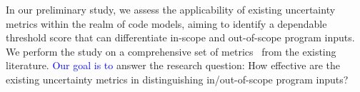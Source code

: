 In our preliminary study,  we assess the applicability of existing uncertainty metrics within the realm of code models, aiming to identify a dependable threshold score that can differentiate in-scope and out-of-scope program inputs. We perform the study on a comprehensive set of metrics~\cite{guo2017calibration,wang2020dissector,hendrycks2018baseline, li2021estimating, alon2019code2vec} from the existing literature. 
\textcolor{blue}{Our goal is to} answer the research question: How effective are the existing uncertainty metrics in distinguishing in/out-of-scope program inputs? 





